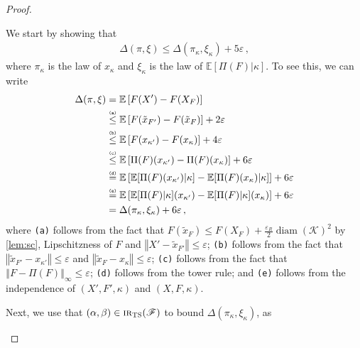 \documentclass[letter, 12pt]{report}
\newcommand{\epsR}{{\epsilon_R}}
\newcommand{\explan}[1]{\stackrel{\text{\tiny \texttt{#1}}}}
\newcommand{\norm}[1]{\left \Vert  #1 \right \Vert}
\newcommand{\E}{\mathbb E}
\newcommand{\cK}{\mathcal K}
\newcommand{\sF}{\mathscr F}
\newcommand{\diam}{\operatorname{diam}}
\newcommand{\1}{\mathbf{1}}
\newcommand{\IR}{\operatorname{\textsc{ir}}}
\newcommand{\ts}{\textsc{TS}\xspace}
\renewcommand{\epsilon}{\varepsilon}
\theoremstyle{plain}
\theoremstyle{definition}
\theoremstyle{remark}
\begin{document}
\begin{proof}
    \begin{enumsteps}
        \item \label{step:tsmain-1} We start by showing that
        \begin{align}
            \Delta(\pi, \xi) \leq \Delta(\pi_\kappa, \xi_\kappa) + 5\epsilon \,, \label{eq:tsmain-1}
        \end{align}
        where $\pi_\kappa$ is the law of $x_\kappa$ and $\xi_\kappa$ is the law of $\E[\Pi(F)|\kappa]$.
        To see this, we can write
        \begin{align*}
            \Delta(\pi, \xi)
             & =\E\left[F(X') - F(X_F)\right]                                                      \\
             & \explan{(a)}\leq\E\left[F(\tilde{x}_{F'}) - F(\tilde{x}_F)\right] + 2\epsilon       \\
             & \explan{(b)}\leq\E\left[F(x_{\kappa'}) - F(x_{\kappa})\right] + 4\epsilon           \\
             & \explan{(c)}\leq\E\left[\Pi(F)(x_{\kappa'}) - \Pi(F)(x_{\kappa})\right] + 6\epsilon \\
             & \explan{(d)}=\E\left[
                \E[\Pi(F)(x_{\kappa'})|\kappa] -
                \E[\Pi(F)(x_{\kappa})|\kappa]
            \right] + 6\epsilon                                                                    \\
             & \explan{(e)}=\E\left[
                \E[\Pi(F)|\kappa](x_{\kappa'}) -
                \E[\Pi(F)|\kappa](x_{\kappa})
            \right] + 6\epsilon                                                                    \\
             & =\Delta(\pi_\kappa, \xi_\kappa) + 6\epsilon\,,
        \end{align*}
        where \texttt{(a)} follows from the fact that $F(\tilde{x}_F) \leq F(X_F) + \tfrac{\epsR}{2}\diam(\cK)^2$ by \cref{lem:sc}, Lipschitzness of $F$ and $\norm{X' - \tilde{x}_{F'}} \leq \epsilon$;
        \texttt{(b)} follows from the fact that $\norm{\tilde{x}_{F'} - x_{\kappa'}} \leq \epsilon$ and $\norm{\tilde{x}_{F} - x_{\kappa}} \leq \epsilon$;
        \texttt{(c)} follows from the fact that $\norm{F - \Pi(F)}_\infty \leq \epsilon$;
        \texttt{(d)} follows from the tower rule;
        and \texttt{(e)} follows from the independence of $(X', F', \kappa)$ and $(X, F, \kappa)$.
        \item \label{step:tsmain-2} Next, we use that $(\alpha, \beta) \in \IR_\ts(\sF)$ to bound $\Delta(\pi_\kappa, \xi_\kappa)$, as

\end{enumsteps}
\end{proof}
\end{document}
